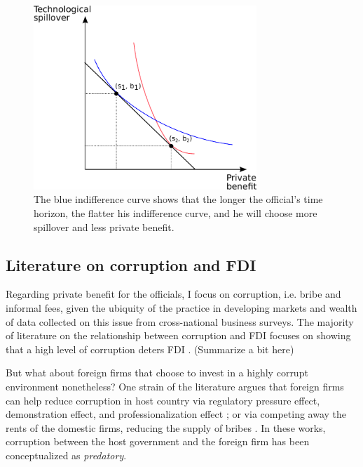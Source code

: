 \begin{figure}[!ht]
	\centering
    \includegraphics[width=0.75\textwidth, height=0.75\textheight,keepaspectratio]{../figure/indifference_curve}
    \caption{The blue indifference curve shows that the longer the official's time horizon, the flatter his indifference curve, and he will choose more spillover and less private benefit.}
    \label{fig:indifference_curve}
\end{figure}

\subsection{Literature on corruption and FDI}

Regarding private benefit for the officials, I focus on corruption, i.e. bribe and informal fees, given the ubiquity of the practice in developing markets and wealth of data collected on this issue from cross-national business surveys. The majority of literature on the relationship between corruption and FDI focuses on showing that a high level of corruption deters FDI \citep{Wei2000, Hakkala2008, Al-Sadig2009}. (Summarize a bit here) 

But what about foreign firms that choose to invest in a highly corrupt environment nonetheless? One strain of the literature argues that foreign firms can help reduce corruption in host country via regulatory pressure effect, demonstration effect, and professionalization effect \citep{Kwok2006}; or via competing away the rents of the domestic firms, reducing the supply of bribes \citep{Sandholtz2003}. In these works, corruption between the host government and the foreign firm has been conceptualized as \textit{predatory}.

